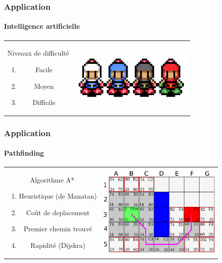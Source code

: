 	\begin{frame}
	\frametitle{Application}
	\framesubtitle{Intelligence artificielle}
	
		\begin{tabular}{cc}
			\begin{minipage}{4cm}
				Niveaux de difficulté
				\begin{enumerate}
					\item Facile
					\item Moyen
					\item Difficile
				\end{enumerate}
			\end{minipage} &
			\begin{minipage}{6cm}
				\includegraphics[width=6cm]{img/bots.png} 
			\end{minipage}\\
		\end{tabular}
	
	\end{frame}
	
	\begin{frame}
	\frametitle{Application}
	\framesubtitle{Pathfinding}
	
		\begin{tabular}{cc}
			\begin{minipage}{5cm}
				Algorithme A*
				\begin{enumerate}
					\item Heuristique (de Manatan)
					\item Coût de deplacement
					\item Premier chemin trouvé
					\item Rapidité (Dijskra)
				\end{enumerate}
			\end{minipage} &
			\begin{minipage}{5cm}
				\includegraphics[width=6cm]{img/astar.png} 
			\end{minipage}\\
		\end{tabular}
	
	\end{frame}
	

